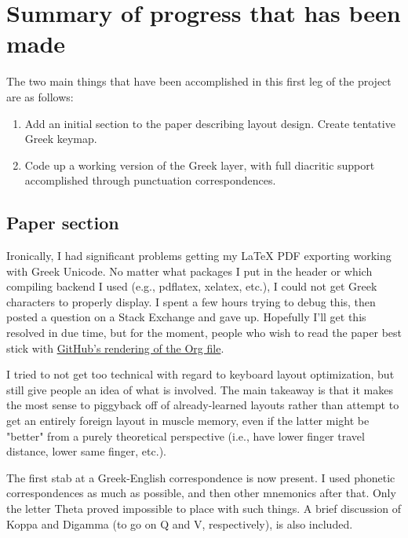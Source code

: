 \documentclass[11pt]{article}
\date{\today}
\title{}
\begin{document}
\tableofcontents

\section{Summary of progress that has been made}
\label{sec:org3cfe2bd}

The two main things that have been accomplished in this first leg of the project are as follows:

\begin{enumerate}
\item Add an initial section to the paper describing layout design. Create tentative Greek keymap.
\item Code up a working version of the Greek layer, with full diacritic support accomplished through punctuation correspondences.
\end{enumerate}

\subsection{Paper section}
\label{sec:org4a22775}

Ironically, I had significant problems getting my \LaTeX{} PDF exporting working with Greek Unicode. No matter what packages I put in the header or which compiling backend I used (e.g., pdflatex, xelatex, etc.), I could not get Greek characters to properly display. I spent a few hours trying to debug this, then posted a question on a Stack Exchange and gave up. Hopefully I'll get this resolved in due time, but for the moment, people who wish to read the paper best stick with \href{https://github.com/StevenTammen/unicode-language-layers/blob/master/docs/design.org}{GitHub's rendering of the Org file}.

I tried to not get too technical with regard to keyboard layout optimization, but still give people an idea of what is involved. The main takeaway is that it makes the most sense to piggyback off of already-learned layouts rather than attempt to get an entirely foreign layout in muscle memory, even if the latter might be "better" from a purely theoretical perspective (i.e., have lower finger travel distance, lower same finger, etc.).

The first stab at a Greek-English correspondence is now present. I used phonetic correspondences as much as possible, and then other mnemonics after that. Only the letter Theta proved impossible to place with such things. A brief discussion of Koppa and Digamma (to go on Q and V, respectively), is also included.
\end{document}
